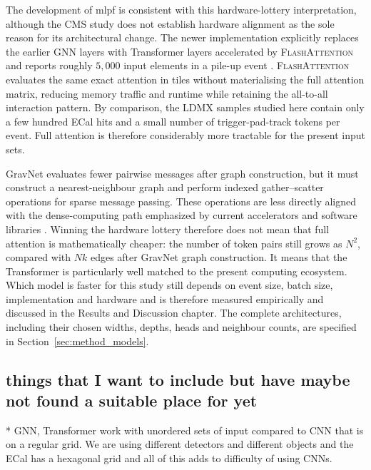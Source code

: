 The development of \gls{mlpf} is consistent with this hardware-lottery
interpretation, although the CMS study does not establish hardware alignment
as the sole reason for its architectural change. The newer implementation
explicitly replaces the earlier GNN layers with Transformer layers accelerated
by \textsc{FlashAttention} and reports roughly \(5{,}000\) input elements in a
pile-up event \cite{pata2026-mlpf}. \textsc{FlashAttention} evaluates the same
exact attention in tiles without materialising the full attention matrix,
reducing memory traffic and runtime while retaining the all-to-all interaction
pattern. By comparison, the LDMX samples studied here contain only a few
hundred ECal hits and a small number of trigger-pad-track tokens per event.
Full attention is therefore considerably more tractable for the present input
sets.

GravNet evaluates fewer pairwise messages after graph construction, but it
must construct a nearest-neighbour graph and perform indexed gather--scatter
operations for sparse message passing. These operations are less directly
aligned with the dense-computing path emphasized by current accelerators and
software libraries \cite{fey2019-pytorch-geometric}. Winning the hardware
lottery therefore does not mean that full attention is mathematically cheaper:
the number of token pairs still grows as \(N^2\), compared with \(Nk\) edges
after GravNet graph construction. It means that the Transformer is
particularly well matched to the present computing ecosystem. Which model is
faster for this study still depends on event size, batch size, implementation
and hardware and is therefore measured empirically and discussed in the Results and Discussion chapter.
The complete architectures, including their chosen widths, depths, heads and
neighbour counts, are specified in Section~\ref{sec:method_models}.


















\subsection{things that I want to include but have maybe not found a suitable place for yet}

* GNN, Transformer work with unordered sets of input compared to CNN that is on a regular grid. We are using different detectors and different objects and the ECal has a hexagonal grid and all of this adds to difficulty of using CNNs. 

